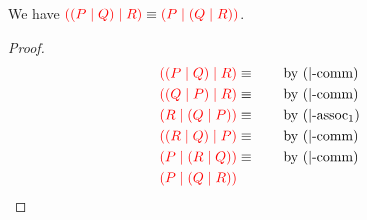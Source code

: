\begin{lemmaB}[\ncEquivPoolAssNoParen2]\label{thm:nc-pool-assoc2}
  We have
  \(
    \textcolor{red}{((P \mid Q) \mid R)} \equiv
    \textcolor{red}{(P \mid (Q \mid R))}
  \).
\end{lemmaB}
\begin{proof}
  \begin{align*}
    \textcolor{red}{((P \mid Q) \mid R)} &\equiv \qquad \text{by \ensuremath{(|\text{-comm})}} \\
    \textcolor{red}{((Q \mid P) \mid R)} &\equiv \qquad \text{by \ensuremath{(|\text{-comm})}} \\
    \textcolor{red}{(R \mid (Q \mid P))} &\equiv \qquad \text{by \ensuremath{(|\text{-assoc}_1)}} \\
    \textcolor{red}{((R \mid Q) \mid P)} &\equiv \qquad \text{by \ensuremath{(|\text{-comm})}} \\
    \textcolor{red}{(P \mid (R \mid Q))} &\equiv \qquad \text{by \ensuremath{(|\text{-comm})}} \\
    \textcolor{red}{(P \mid (Q \mid R))}
  \end{align*}
\end{proof}

